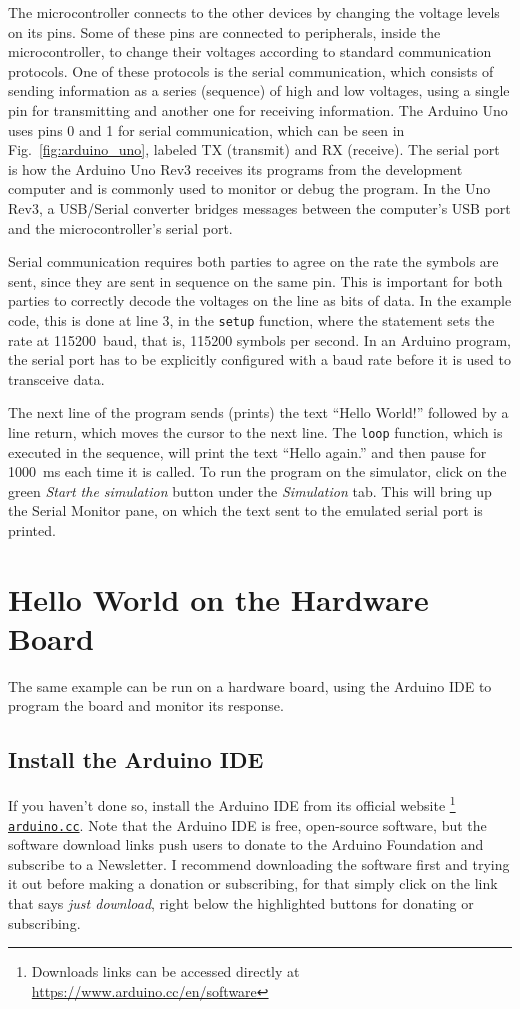 The microcontroller connects to the other devices by changing the voltage levels on its pins.
Some of these pins are connected to peripherals, inside the microcontroller, to change their voltages according to standard communication protocols.
One of these protocols is the serial communication, which consists of sending information as a series (sequence) of high and low voltages, using a single pin for transmitting and another one for receiving information.
The Arduino Uno uses pins 0 and 1 for serial communication, which can be seen in Fig.~\ref{fig:arduino_uno}, labeled TX (transmit) and RX (receive).
The serial port is how the Arduino Uno Rev3 receives its programs from the development computer and is commonly used to monitor or debug the program.
In the Uno Rev3, a USB/Serial converter bridges messages between the computer's USB port and the microcontroller's serial port.

Serial communication requires both parties to agree on the rate the symbols are sent, since they are sent in sequence on the same pin.
This is important for both parties to correctly decode the voltages on the line as bits of data.
In the example code, this is done at line 3, in the \texttt{setup} function, where the statement  sets the rate at \SI{115200}{baud}, that is, \num{115200} symbols per second.
In an Arduino program, the serial port has to be explicitly configured with a baud rate before it is used to transceive data.

The next line of the program sends (prints) the text ``Hello World!'' followed by a line return, which moves the cursor to the next line.
The \texttt{loop} function, which is executed in the sequence, will print the text ``Hello again.'' and then pause for \SI{1000}{ms} each time it is called.
To run the program on the simulator, click on the green \emph{Start the simulation} button under the \emph{Simulation} tab.
This will bring up the Serial Monitor pane, on which the text sent to the emulated serial port is printed.

\section{Hello World on the Hardware Board}

The same example can be run on a hardware board, using the Arduino IDE to program the board and monitor its response.

\subsection{Install the Arduino IDE}
If you haven't done so, install the Arduino IDE from its official website%
\footnote{Downloads links can be accessed directly at \url{https://www.arduino.cc/en/software}}
\texttt{\href{https://www.arduino.cc/en/software}{arduino.cc}}.
Note that the Arduino IDE is free, open-source software, but the software download links push users to donate to the Arduino Foundation and subscribe to a Newsletter.
I recommend downloading the software first and trying it out before making a donation or subscribing, for that simply click on the link that says \emph{just download}, right below the highlighted buttons for donating or subscribing.

